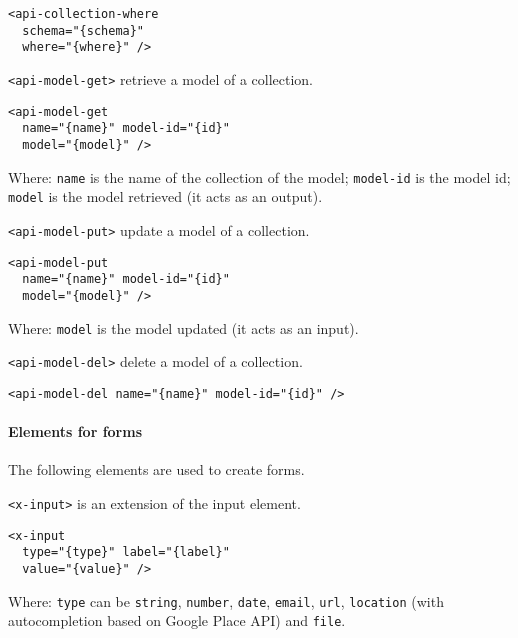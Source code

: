 \begin{lstlisting}[language=HTML5]
<api-collection-where 
  schema="{schema}"
  where="{where}" />
\end{lstlisting}

\texttt{<api-model-get>} retrieve a model of a collection. 

\begin{lstlisting}[language=HTML5]
<api-model-get 
  name="{name}" model-id="{id}" 
  model="{model}" />
\end{lstlisting}

Where: 
\texttt{name} is the name of the collection of the model; 
\texttt{model-id} is the model id; 
\texttt{model} is the model retrieved (it acts as an output).

\texttt{<api-model-put>} update a model of a collection. 

\begin{lstlisting}[language=HTML5]
<api-model-put 
  name="{name}" model-id="{id}" 
  model="{model}" />
\end{lstlisting}

Where: 
\texttt{model} is the model updated (it acts as an input).

\vspace{0.2cm}

\texttt{<api-model-del>} delete a model of a collection. 

\begin{lstlisting}[language=HTML5]
<api-model-del name="{name}" model-id="{id}" />
\end{lstlisting}

\paragraph{Elements for forms}
The following elements are used to create forms. 

\vspace{0.2cm}

\texttt{<x-input>} is an extension of the input element. 

\begin{lstlisting}[language=HTML5]
<x-input 
  type="{type}" label="{label}"
  value="{value}" />
\end{lstlisting}

Where: 
\texttt{type} can be \texttt{string}, \texttt{number}, \texttt{date}, \texttt{email}, \texttt{url}, \texttt{location} (with autocompletion based on Google Place API) and \texttt{file}.


